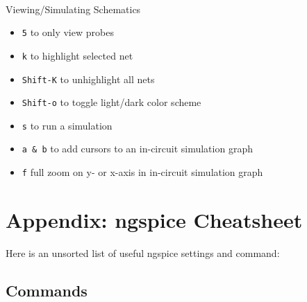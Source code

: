 \documentclass[
  a4paper,
  DIV=11,
  numbers=noendperiod]{scrartcl}
\makeatletter
\let\oldparagraph\paragraph
\renewcommand{\paragraph}{
    \@ifstar
      \xxxParagraphStar
      \xxxParagraphNoStar
  }
\newcommand{\xxxParagraphStar}[1]{\oldparagraph*{#1}\mbox{}}
\newcommand{\xxxParagraphNoStar}[1]{\oldparagraph{#1}\mbox{}}
\providecommand{\tightlist}{%
  \setlength{\itemsep}{0pt}\setlength{\parskip}{0pt}}\usepackage{longtable,booktabs,array}
\makeatother
\begin{document}
\paragraph{Viewing/Simulating
Schematics}\label{viewingsimulating-schematics}

\begin{itemize}
\tightlist
\item
  \texttt{5} to only view probes
\item
  \texttt{k} to highlight selected net
\item
  \texttt{Shift-K} to unhighlight all nets
\item
  \texttt{Shift-o} to toggle light/dark color scheme
\item
  \texttt{s} to run a simulation
\item
  \texttt{a\ \&\ b} to add cursors to an in-circuit simulation graph
\item
  \texttt{f} full zoom on y- or x-axis in in-circuit simulation graph
\end{itemize}

\section{Appendix: ngspice Cheatsheet}\label{sec-ngspice-cheatsheet}

Here is an unsorted list of useful ngspice settings and command:

\subsection{Commands}\label{commands}
\end{document}
